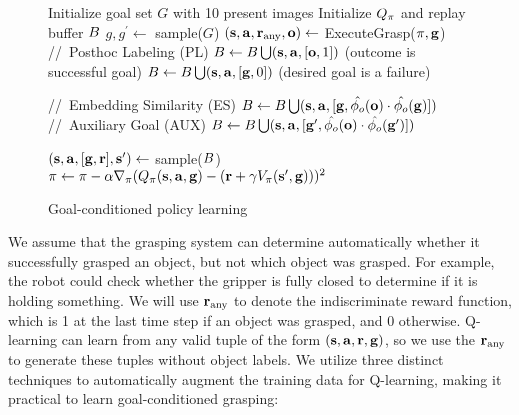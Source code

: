 \documentclass{article}
\begin{document}
 \begin{wrapfigure}{R}{0.55\textwidth}
 \vspace{-0.5cm}
    \begin{minipage}{0.55\textwidth}
       \begin{algorithm}[H]{\small
        \caption{Goal-conditioned policy learning}
        \label{alg:instancelabeling}
        \begin{algorithmic}[1]
        \STATE Initialize goal set \(G\) with 10 present images
        \STATE Initialize $Q_{\pi}$ and replay buffer \(B\)
            \STATE $g, g^\prime \gets$ sample(\(G\))
            \STATE \((\mathbf{s}, \mathbf{a}, \mathbf{r}_\text{any}, \mathbf{o}) \gets\) ExecuteGrasp($\pi, \mathbf{g}$)
            \STATE //~Posthoc Labeling (PL)
                \STATE \(B \gets B \bigcup (\mathbf{s}, \mathbf{a}, [\mathbf{o}, 1])\) (outcome is successful goal)
            \ELSE
                \STATE \(B \gets B \bigcup (\mathbf{s}, \mathbf{a}, [\mathbf{g}, 0])\) (desired goal is a failure)
            \ENDIF

            \STATE //~Embedding Similarity (ES)
          \STATE \(B \gets B \bigcup (\mathbf{s}, \mathbf{a}, [\mathbf{g}, \hat{\phi_o}(\mathbf{o}) \cdot \hat{\phi_o}(\mathbf{g})])\)
          \STATE //~Auxiliary Goal (AUX)
          \STATE \(B \gets B \bigcup (\mathbf{s}, \mathbf{a}, [\mathbf{g^\prime}, \hat{\phi_o}(\mathbf{o}) \cdot \hat{\phi_o}(\mathbf{g^\prime})])\)
            \ENDIF


            \STATE \((\mathbf{s}, \mathbf{a}, [\mathbf{g}, \mathbf{r}], \mathbf{s^\prime}) \gets \) sample(\(B\))
            \STATE \(\pi \gets \pi - \alpha \nabla_\pi (Q_{\pi}(\mathbf{s}, \mathbf{a}, \mathbf{g}) - (\mathbf{r} + \gamma V_\pi(\mathbf{s^\prime}, \mathbf{g})))^2 \)
        \ENDWHILE
        \end{algorithmic}
}
\end{algorithm}
    \end{minipage}
  \end{wrapfigure}

We assume that the grasping system can determine automatically whether it successfully grasped an object, but not  which object was grasped. For example, the robot could check whether the gripper is fully closed to determine if it is holding something. We will use $\mathbf{r}_\text{any}$ to denote the indiscriminate reward function, which is 1 at the last time step if an object was grasped, and 0 otherwise. Q-learning can learn from any valid tuple of the form \((\mathbf{s}, \mathbf{a}, \mathbf{r}, \mathbf{g})\), so we use the $\mathbf{r}_\text{any}$ to generate these tuples without object labels. We utilize three distinct techniques to automatically augment the training data for Q-learning, making it practical to learn goal-conditioned grasping:
\end{document}

